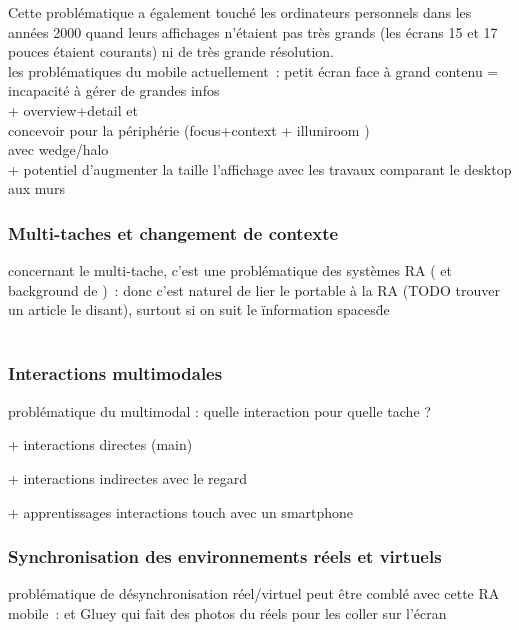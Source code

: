 Cette problématique a également touché les ordinateurs personnels dans les années 2000 quand leurs affichages n'étaient pas très grands (les écrans 15 et 17 pouces étaient courants) ni de très grande résolution. \\
les problématiques du mobile actuellement~: petit écran face à grand contenu = incapacité à gérer de grandes infos \\
+ overview+detail \cite{BergeSerranoPerelmanEtAl2014} et \cite{RashidNacentaQuigley2012}\\
concevoir pour la périphérie (focus+context \cite{CockburnKarlsonBederson2009}
+ illuniroom \cite{JonesBenkoOfekEtAl2013}) \\
avec wedge/halo \cite{BaudischRosenholtz2003} \cite{GustafsonBaudischGutwinEtAl2008} \cite{BurigatChittaro2011} \\
+ potentiel d'augmenter la taille l'affichage avec les travaux comparant le desktop aux murs \cite{LiuChapuisBeaudouin-LafonEtAl2014} \cite{ShuppBallYostEtAl2006} \cite{TanGergleScupelliEtAl2003}


\subsubsection*{Multi-taches et changement de contexte}
concernant le multi-tache, c'est une problématique des systèmes RA (\cite{SchmalstiegFuhrmannHesinaEtAl2002} et background de \cite{EnsFinneganIrani2014})~: donc c'est naturel de lier le portable à la RA (TODO trouver un article le disant), surtout si on suit le \"information spaces\" de \cite{EnsHincapie-RamosIrani2014} \\
\cite{TanCzerwinski2003} \\
\cite{RashidNacentaQuigley2012a}


\subsubsection*{Interactions multimodales}
problématique du multimodal : quelle interaction pour quelle tache ?

+ interactions directes (main)

+ interactions indirectes avec le regard

+ apprentissages interactions touch avec un smartphone


\subsubsection*{Synchronisation des environnements réels et virtuels}
problématique de désynchronisation réel/virtuel peut être comblé avec cette RA mobile~: \cite{Chalon2004} et Gluey qui fait des photos du réels pour les coller sur l'écran



